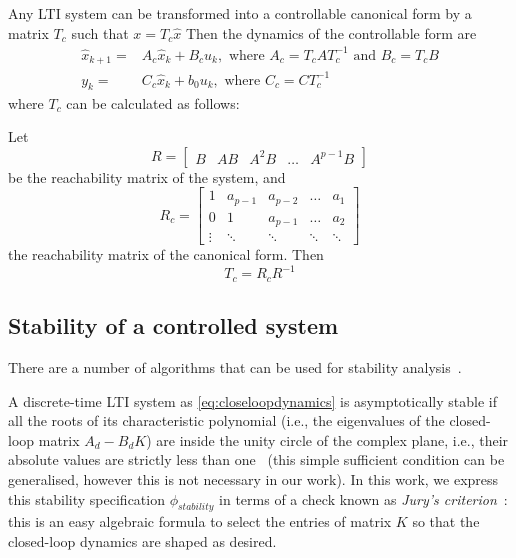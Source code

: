 \documentclass[sigconf]{llncs}
\newcommand{\mat}[1]{{#1}}
\renewcommand{\vec}[1]{{#1}}
\begin{document}
Any LTI system can be transformed into a controllable canonical form by a matrix $\mat{T}_c$ such that $\vec{x}=\mat{T}_c\hat{\vec{x}}$
Then the dynamics of the controllable form are
\begin{align}
\hat{\vec{x}}_{k+1}=&\mat{A}_c\hat{\vec{x}}_k+\mat{B}_cu_k, \text{ where } \mat{A}_c=\mat{T}_c\mat{A}\mat{T}_c^{-1} \text{ and } \mat{B}_c=\mat{T}_c\mat{B}\\
y_k=&\mat{C}_c\hat{\vec{x}}_k + b_0u_k, \text{ where } \mat{C}_c=\mat{C}\mat{T}_c^{-1}\nonumber
\end{align}
where $\mat{T}_c$ can be calculated as follows:

Let 
\begin{equation}
\mat{R}=[\begin{array}{ccccc}\mat{B}&\mat{A}\mat{B}&\mat{A}^2\mat{B}&\hdots&\mat{A}^{p-1}\mat{B}\end{array}]
\label{eq:rncf}
\end{equation}
be the reachability matrix of the system, and
\begin{equation}
\mat{R}_{c}=\left[\begin{array}{ccccc}1&a_{p-1}&a_{p-2}&\hdots&a_1\\0&1&a_{p-1}&\hdots&a_2\\ \vdots&\ddots&\ddots&\ddots&\ddots\end{array}\right]
\label{eq:rcf}
\end{equation}
the reachability matrix of the canonical form. Then 
\begin{equation}
\mat{T}_c=\mat{R}_{c}\mat{R}^{-1}
\label{eq:to_cf}
\end{equation}

\subsection{Stability of a controlled system} 
\label{sec:closed_stability}
There are a number of algorithms that can be
used for stability analysis~\cite{daes20161,Bessa16}.

A discrete-time LTI system as \eqref{eq:closeloopdynamics} is
asymptotically stable if all the roots of its characteristic
polynomial (i.e., the eigenvalues of the closed-loop matrix $A_d - B_d
K$) are inside the unity circle of the complex plane, i.e., their
absolute values are strictly less than one~\cite{astrom1997computer}
(this simple sufficient condition can be generalised, however this is
not necessary in our work).  In this work, we express this stability
specification $\phi_\mathit{stability}$ in terms of a check known as
\emph{Jury's criterion}~\cite{fadali}: this is an easy algebraic
formula to select the entries of matrix $K$ so that the closed-loop
dynamics are shaped as desired.
\end{document}

